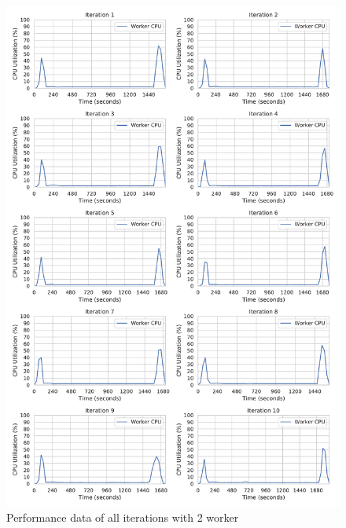 \begin{figure}[h]
\centering
\includegraphics[scale=0.4]{images/07_evaluation/classification/2_worker_cpu_performance}
\caption{Performance data of all iterations with 2 worker}
\label{fig:appendix_eval_classification_static2}
\end{figure}

